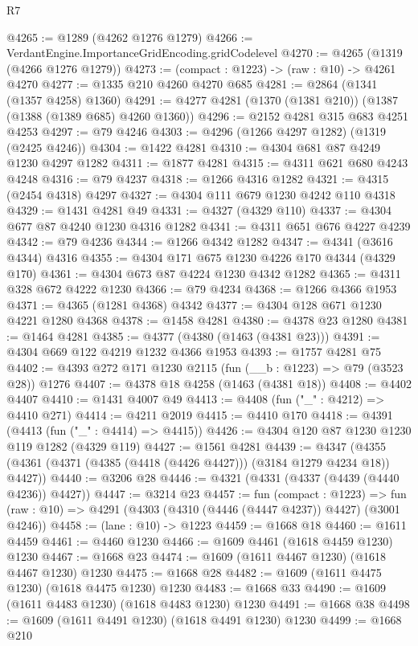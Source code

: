 \begin{lexlean}{R7}
\begin{coremodule}
@4265 := @1289 (@4262 @1276 @1279)
@4266 := VerdantEngine.ImportanceGridEncoding.gridCodelevel
@4270 := @4265 (@1319 (@4266 @1276 @1279))
@4273 := (compact : @1223) -> (raw : @10) -> @4261 @4270
@4277 := @1335 @210 @4260 @4270 @685
@4281 := @2864 (@1341 (@1357 @4258) @1360)
@4291 := @4277 @4281 (@1370 (@1381 @210)) (@1387 (@1388 (@1389 @685) @4260 @1360))
@4296 := @2152 @4281 @315 @683 @4251 @4253
@4297 := @79 @4246
@4303 := @4296 (@1266 @4297 @1282) (@1319 (@2425 @4246))
@4304 := @1422 @4281
@4310 := @4304 @681 @87 @4249 @1230 @4297 @1282
@4311 := @1877 @4281
@4315 := @4311 @621 @680 @4243 @4248
@4316 := @79 @4237
@4318 := @1266 @4316 @1282
@4321 := @4315 (@2454 @4318) @4297
@4327 := @4304 @111 @679 @1230 @4242 @110 @4318
@4329 := @1431 @4281 @49
@4331 := @4327 (@4329 @110)
@4337 := @4304 @677 @87 @4240 @1230 @4316 @1282
@4341 := @4311 @651 @676 @4227 @4239
@4342 := @79 @4236
@4344 := @1266 @4342 @1282
@4347 := @4341 (@3616 @4344) @4316
@4355 := @4304 @171 @675 @1230 @4226 @170 @4344 (@4329 @170)
@4361 := @4304 @673 @87 @4224 @1230 @4342 @1282
@4365 := @4311 @328 @672 @4222 @1230
@4366 := @79 @4234
@4368 := @1266 @4366 @1953
@4371 := @4365 (@1281 @4368) @4342
@4377 := @4304 @128 @671 @1230 @4221 @1280 @4368
@4378 := @1458 @4281
@4380 := @4378 @23 @1280
@4381 := @1464 @4281
@4385 := @4377 (@4380 (@1463 (@4381 @23)))
@4391 := @4304 @669 @122 @4219 @1232 @4366 @1953
@4393 := @1757 @4281 @75
@4402 := @4393 @272 @171 @1230 @2115 (fun (__b : @1223) => @79 (@3523 @28)) @1276
@4407 := @4378 @18 @4258 (@1463 (@4381 @18))
@4408 := @4402 @4407
@4410 := @1431 @4007 @49
@4413 := @4408 (fun ("_" : @4212) => @4410 @271)
@4414 := @4211 @2019
@4415 := @4410 @170
@4418 := @4391 (@4413 (fun ("_" : @4414) => @4415))
@4426 := @4304 @120 @87 @1230 @1230 @119 @1282 (@4329 @119)
@4427 := @1561 @4281
@4439 := @4347 (@4355 (@4361 (@4371 (@4385 (@4418 (@4426 @4427))) (@3184 @1279 @4234 @18)) @4427))
@4440 := @3206 @28
@4446 := @4321 (@4331 (@4337 (@4439 (@4440 @4236)) @4427))
@4447 := @3214 @23
@4457 := fun (compact : @1223) =>
  fun (raw : @10) => @4291 (@4303 (@4310 (@4446 (@4447 @4237)) @4427) (@3001 @4246))
@4458 := (lane : @10) -> @1223
@4459 := @1668 @18
@4460 := @1611 @4459
@4461 := @4460 @1230
@4466 := @1609 @4461 (@1618 @4459 @1230) @1230
@4467 := @1668 @23
@4474 := @1609 (@1611 @4467 @1230) (@1618 @4467 @1230) @1230
@4475 := @1668 @28
@4482 := @1609 (@1611 @4475 @1230) (@1618 @4475 @1230) @1230
@4483 := @1668 @33
@4490 := @1609 (@1611 @4483 @1230) (@1618 @4483 @1230) @1230
@4491 := @1668 @38
@4498 := @1609 (@1611 @4491 @1230) (@1618 @4491 @1230) @1230
@4499 := @1668 @210

\end{coremodule}
\end{lexlean}
